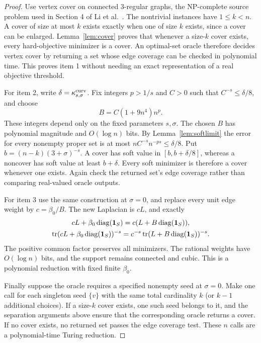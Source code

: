 \begin{proof}
Use vertex cover on connected $3$-regular graphs, the NP-complete
source problem used in Section 4 of Li et al.~\cite{li2019}.
The nontrivial instances have $1\leq k<n$. A cover of size at most
$k$ exists exactly when one of size $k$ exists, since a cover can
be enlarged. Lemma~\ref{lem:cover} proves that whenever a size-$k$
cover exists, every hard-objective minimizer is a cover. An optimal-set
oracle therefore decides vertex cover by returning a set whose edge
coverage can be checked in polynomial time. This proves item 1
without needing an exact representation of a real objective threshold.

For item 2, write $\delta=\kappa_{s,\sigma}^{\rm curv}$. Fix integers
$p>1/s$ and $C>0$ such that $C^{-s}\leq\delta/8$, and choose
\[
 B=C(1+9n^4)n^p.
\]
These integers depend only on the fixed parameters $s,\sigma$.
The chosen $B$ has polynomial magnitude and $O(\log n)$ bits.
By Lemma~\ref{lem:softlimit} the error for every nonempty proper
set is at most
$nC^{-s}n^{-ps}\leq\delta/8$. Put $b=(n-k)(3+\sigma)^{-s}$.
A cover has soft value in $[b,b+\delta/8]$, whereas a noncover
has soft value at least $b+\delta$. Every soft minimizer is therefore
a cover whenever one exists. Again check the returned set's edge
coverage rather than comparing real-valued oracle outputs.

For item 3 use the same construction at $\sigma=0$, and replace
every unit edge weight by $c=\beta_0/B$. The new Laplacian is $cL$,
and exactly
\begin{gather*}
 cL+\beta_0\operatorname{diag}(\mathbf 1_S)=c(L+B\operatorname{diag}(\mathbf 1_S)),\\
 \operatorname{tr}(cL+\beta_0\operatorname{diag}(\mathbf 1_S))^{-s}
 =c^{-s}\operatorname{tr}(L+B\operatorname{diag}(\mathbf 1_S))^{-s}.
\end{gather*}
The positive common factor preserves all minimizers. The rational
weights have $O(\log n)$ bits, and the support remains connected and
cubic. This is a polynomial reduction with fixed finite $\beta_0$.

Finally suppose the oracle requires a specified nonempty seed at
$\sigma=0$. Make one call for each singleton seed $\{v\}$ with the
same total cardinality $k$ (or $k-1$ additional choices).
If a size-$k$ cover exists, one such seed belongs to it, and the
separation arguments above ensure that the corresponding oracle
returns a cover. If no cover exists, no returned set passes the edge
coverage test. These $n$ calls are a polynomial-time Turing reduction.
\end{proof}

